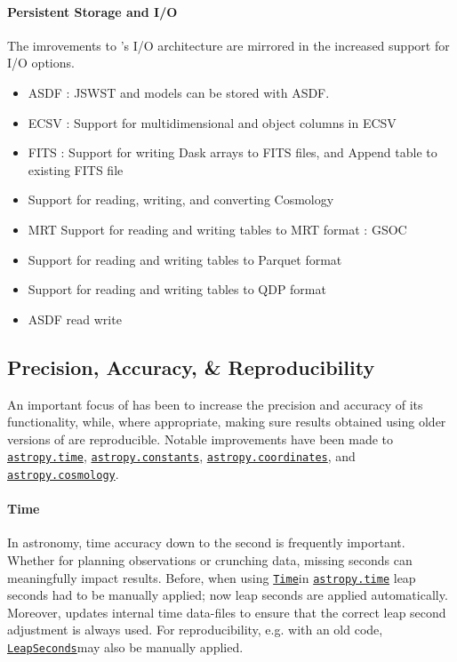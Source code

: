\documentclass[modern]{aastex631}
\newcommand{\astropysubpkg}[1]{\href{http://docs.astropy.org/en/stable/#1/index.html}{\texttt{astropy.#1}}\xspace}
\newcommand{\astropycosmology}{\astropysubpkg{cosmology}}
\newcommand{\astropycoordinates}{\astropysubpkg{coordinates}}
\newcommand{\astropyconstants}{\astropysubpkg{constants}}
\newcommand{\astropytime}{\astropysubpkg{time}}
\newcommand{\astropyapi}[2]{\href{https://docs.astropy.org/en/stable/api/astropy.#1.html}{#2}}
\newcommand{\astropyapidoc}[2]{\astropyapi{#1}{\texttt{#2}\xspace}}
\newcommand{\astropyTime}{\astropyapidoc{time.Time}{Time}}
\newcommand{\astropyLeapSeconds}{\astropyapidoc{time.LeapSeconds}{LeapSeconds}}
\begin{document}
  \paragraph{Persistent Storage and I/O}

    The imrovements to \astropy's I/O architecture are mirrored in the increased support for I/O options.

    \begin{itemize}
      \item ASDF : JSWST  and models can be stored with ASDF.
      \item ECSV : Support for multidimensional and object columns in ECSV
      \item FITS : Support for writing Dask arrays to FITS files, and Append table to existing FITS file
      \item Support for reading, writing, and converting Cosmology
      \item MRT Support for reading and writing tables to MRT format : GSOC
      \item Support for reading and writing tables to Parquet format
      \item Support for reading and writing tables to QDP format
      \item ASDF read write
    \end{itemize}


\subsection*{Precision, Accuracy, \& Reproducibility} \label{sec:core-features-precision_accuracy_repreducibility}

  An important focus of \astropy has been to increase the precision and accuracy
  of its functionality, while, where appropriate, making sure results obtained
  using older versions of \astropypkg are reproducible.
  Notable improvements have been made to \astropytime, \astropyconstants,
  \astropycoordinates, and \astropycosmology.

  \paragraph{Time}

    In astronomy, time accuracy down to the second is frequently important.
    Whether for planning observations or crunching data, missing seconds can
    meaningfully impact results. Before, when using \astropyTime in \astropytime
    leap seconds had to be manually applied; now leap seconds are applied
    automatically. Moreover, \astropypkg updates internal time data-files to
    ensure that the correct leap second adjustment is always used. For
    reproducibility, e.g. with an old code, \astropyLeapSeconds may also be
    manually applied.
\end{document}
